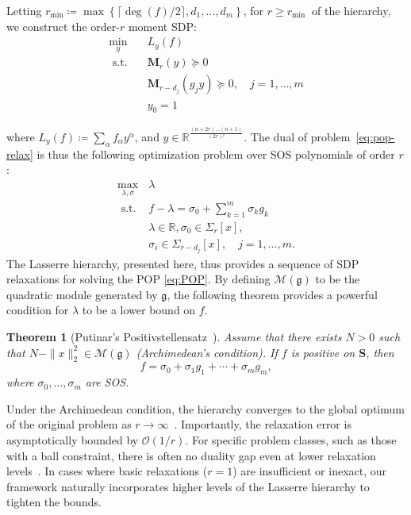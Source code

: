 \documentclass[10pt]{article} %
\theoremstyle{plain}
\newtheorem{theorem}{Theorem}[section]
\theoremstyle{definition}
\theoremstyle{remark}
\begin{document}
Letting $r_{\min }\coloneq\max \left\{\lceil\operatorname{deg}(f) / 2\rceil, d_1, \ldots, d_m\right\}$, for $r \geq r_{\text {min }}$ of the hierarchy, we construct the order-$r$ moment SDP:
\begin{equation}
\begin{aligned}
\min _{y}\quad & L_{y}(f)  \\
\text { s.t. }\ \ \ &
\mathbf{M}_r(y) \succeq 0 \\
&  \mathbf{M}_{r-d_j}\left(g_j y\right) \succeq 0, \quad j =1,\dots,m \\
& y_0=1
\end{aligned}
\label{eq:pop-relax}
\end{equation}

\vspace{-1em}
where $L_{y}(f)\coloneq \sum_\alpha f_\alpha y^\alpha$, and $y \in \mathbb{R}^{\frac{(n+2r)\dots (n+1)}{(2r)!}}$. The dual of problem~\eqref{eq:pop-relax} is thus the following optimization problem over SOS polynomials of order $r$:
\vspace{-0.5em}
\begin{equation}
\label{eq:Lasserre-sos}
\begin{array}{cc}
\underset{\lambda, \sigma}\max & \lambda \\
\text { s.t. } & f-\lambda=\sigma_0+\sum_{k=1}^m \sigma_k g_k \\
& \lambda \in \mathbb{R}, \sigma_0 \in \Sigma_r[x], \\
& \sigma_i \in \Sigma_{r-d_j}[x], \quad j=1, \ldots, m .
\end{array}
\end{equation}
The Lasserre hierarchy, presented here, thus provides a sequence of SDP relaxations for solving the POP \eqref{eq:POP}. By defining $\mathcal{M}(\mathfrak{g})$ to be the quadratic module generated by $\mathfrak{g}$,  the following theorem provides a powerful condition for $\lambda$ to be a  lower bound on $f$.

\begin{theorem}[Putinar's Positivstellensatz~\citep{putinar1993positive}]
Assume that there exists $N>0$ such that $N-\|x\|_2^2 \in \mathcal{M}(\mathfrak{g})$ (Archimedean's condition). If $f$ is positive on $\mathbf{S}$, then
\vspace{-0.5em}
\begin{equation}
\label{eq:thm-sos}
f=\sigma_0+\sigma_1 g_1+\cdots+\sigma_m g_m,
\end{equation}
where $\sigma_0, \ldots, \sigma_m$ are SOS.
\vspace{-0.5em}
\end{theorem} 
Under the Archimedean condition, the hierarchy converges to the global optimum of the original problem as $r \to \infty$~\citep{lasserre2001global}. Importantly, the relaxation error is asymptotically bounded by $\mathcal{O}(1/r)$. For specific problem classes, such as those with a ball constraint, there is often no duality gap even at lower relaxation levels~\citep{josz2016strong}. In cases where basic relaxations ($r=1$) are insufficient or inexact, our framework naturally incorporates higher levels of the Lasserre hierarchy to tighten the bounds.
\end{document}
